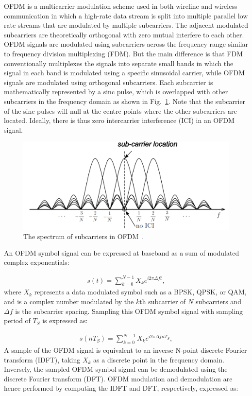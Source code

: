 OFDM is a multicarrier modulation scheme used in both wireline and wireless communication in which a high-rate data stream is split into multiple parallel low rate streams that are modulated by multiple subcarriers.
The adjacent modulated subcarriers are theoretically orthogonal with zero mutual interfere to each other.
OFDM signals are modulated using subcarriers across the frequency range similar to frequency division multiplexing (FDM).
But the main difference is that FDM conventionally multiplexes the signals into separate small bands in which the signal in each band is modulated using a specific sinusoidal carrier, while OFDM signals are modulated using orthogonal subcarriers.
Each subcarrier is mathematically represented by a sinc pulse, which is overlapped with other subcarriers in the frequency domain as shown in Fig.~\ref{fig:OFDM-subcarrier}.
Note that the subcarrier of the sinc pulses will null at the centre points where the other subcarriers are located. Ideally, there is thus zero intercarrier interference (ICI) in an OFDM signal.

\begin{figure}
	\centerline{\includegraphics [width=0.8\columnwidth] {Figures/OFDM-subcarrier.pdf} }
	\caption{The spectrum of subcarriers in OFDM~\cite{farhang2008signal}.}
	\label{fig:OFDM-subcarrier}
\end{figure}

An OFDM symbol signal can be expressed at baseband as a sum of modulated complex exponentials:

\begin{eqnarray}
\label{equ:OFDMsignal}
s(t) = \sum_{k=0}^{N-1} X_k e^{i2\pi\Delta ft},
\end{eqnarray}
where $X_{k}$ represents a data modulated symbol such as a BPSK, QPSK, or QAM, and is a complex number modulated by the $k$th subcarrier of $N$ subcarriers and $\Delta f$ is the subcarrier spacing.
Sampling this OFDM symbol signal with sampling period of $T_S$ is expressed as:

\begin{eqnarray}
\label{equ:sampledOFDMsignal}
s(nT_S) = \sum_{k=0}^{N-1} X_k e^{i2\pi\Delta fnT_S},
\end{eqnarray}
A sample of the OFDM signal is equivalent to an inverse N-point discrete Fourier transform (IDFT), taking $X_{k}$ as a discrete point in the frequency domain.
Inversely, the sampled OFDM symbol signal can be demodulated using the discrete Fourier transform (DFT). OFDM modulation and demodulation are hence performed by computing the IDFT and DFT, respectively, expressed as:

